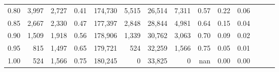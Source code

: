 \begin{tabular}{rrrrrrrrrrrrrr}
0.80 &   3,997 &  2,727 &  0.41 &  174,730 &    5,515 &  26,514 &   7,311 &  0.57 &  0.22 &      0.06 \\
0.85 &   2,667 &  2,330 &  0.47 &  177,397 &    2,848 &  28,844 &   4,981 &  0.64 &  0.15 &      0.04 \\
0.90 &   1,509 &  1,918 &  0.56 &  178,906 &    1,339 &  30,762 &   3,063 &  0.70 &  0.09 &      0.02 \\
0.95 &     815 &  1,497 &  0.65 &  179,721 &      524 &  32,259 &   1,566 &  0.75 &  0.05 &      0.01 \\
1.00 &     524 &  1,566 &  0.75 &  180,245 &        0 &  33,825 &       0 &   nan &  0.00 &      0.00 \\
\bottomrule
\end{tabular}
